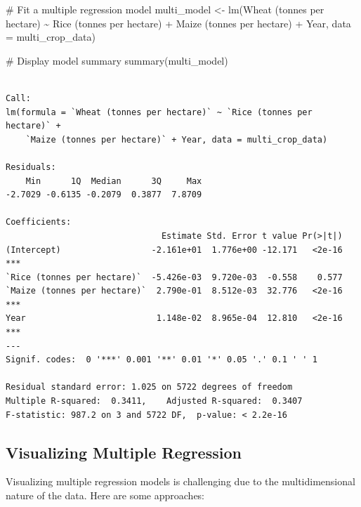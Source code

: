 \documentclass[
  letterpaper,
]{book}
\newenvironment{Shaded}{\begin{snugshade}}{\end{snugshade}}
\newcommand{\AttributeTok}[1]{\textcolor[rgb]{0.40,0.45,0.13}{#1}}
\newcommand{\CommentTok}[1]{\textcolor[rgb]{0.37,0.37,0.37}{#1}}
\newcommand{\FunctionTok}[1]{\textcolor[rgb]{0.28,0.35,0.67}{#1}}
\newcommand{\NormalTok}[1]{\textcolor[rgb]{0.00,0.23,0.31}{#1}}
\newcommand{\OtherTok}[1]{\textcolor[rgb]{0.00,0.23,0.31}{#1}}
\newcommand{\SpecialCharTok}[1]{\textcolor[rgb]{0.37,0.37,0.37}{#1}}
\newcommand{\StringTok}[1]{\textcolor[rgb]{0.13,0.47,0.30}{#1}}
\begin{document}
\begin{Shaded}
\begin{Highlighting}[]
\CommentTok{\# Fit a multiple regression model}
\NormalTok{multi\_model }\OtherTok{\textless{}{-}} \FunctionTok{lm}\NormalTok{(}\StringTok{\textasciigrave{}}\AttributeTok{Wheat (tonnes per hectare)}\StringTok{\textasciigrave{}} \SpecialCharTok{\textasciitilde{}} \StringTok{\textasciigrave{}}\AttributeTok{Rice (tonnes per hectare)}\StringTok{\textasciigrave{}} \SpecialCharTok{+} \StringTok{\textasciigrave{}}\AttributeTok{Maize (tonnes per hectare)}\StringTok{\textasciigrave{}} \SpecialCharTok{+}\NormalTok{ Year, }\AttributeTok{data =}\NormalTok{ multi\_crop\_data)}

\CommentTok{\# Display model summary}
\FunctionTok{summary}\NormalTok{(multi\_model)}
\end{Highlighting}
\end{Shaded}

\begin{verbatim}

Call:
lm(formula = `Wheat (tonnes per hectare)` ~ `Rice (tonnes per hectare)` + 
    `Maize (tonnes per hectare)` + Year, data = multi_crop_data)

Residuals:
    Min      1Q  Median      3Q     Max 
-2.7029 -0.6135 -0.2079  0.3877  7.8709 

Coefficients:
                               Estimate Std. Error t value Pr(>|t|)    
(Intercept)                  -2.161e+01  1.776e+00 -12.171   <2e-16 ***
`Rice (tonnes per hectare)`  -5.426e-03  9.720e-03  -0.558    0.577    
`Maize (tonnes per hectare)`  2.790e-01  8.512e-03  32.776   <2e-16 ***
Year                          1.148e-02  8.965e-04  12.810   <2e-16 ***
---
Signif. codes:  0 '***' 0.001 '**' 0.01 '*' 0.05 '.' 0.1 ' ' 1

Residual standard error: 1.025 on 5722 degrees of freedom
Multiple R-squared:  0.3411,    Adjusted R-squared:  0.3407 
F-statistic: 987.2 on 3 and 5722 DF,  p-value: < 2.2e-16
\end{verbatim}

\subsection{Visualizing Multiple
Regression}\label{visualizing-multiple-regression}

Visualizing multiple regression models is challenging due to the
multidimensional nature of the data. Here are some approaches:
\end{document}
